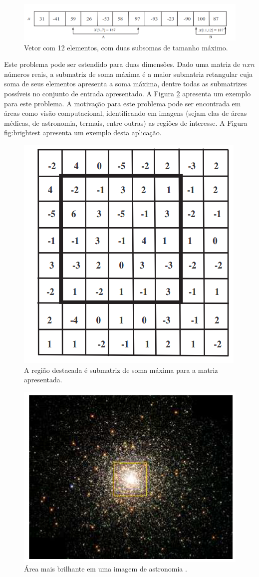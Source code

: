 \documentclass[a4paper, 12pt] {article}
\begin{document}
\begin{figure}[ht]
\centering
\includegraphics[width=\textwidth]{maxsubsum.png}
\caption{Vetor com 12 elementos, com duas subsomas de tamanho máximo.}
\label{fig:maxsubsum}
\end{figure}

Este problema pode ser estendido para duas dimensões. Dado uma matriz de $nxn$
números reais, a submatriz de soma máxima é a maior submatriz retangular cuja
soma de seus elementos apresenta a soma máxima, dentre todas as submatrizes
possíveis no conjunto de entrada apresentado. A Figura \ref{fig:maxsubarray}
apresenta um exemplo para este problema. A motivação para este problema pode ser
encontrada em áreas como visão computacional, identificando em imagens (sejam
elas de áreas médicas, de astronomia, termais, entre outras) as regiões de
interesse. A Figura {fig:brightest} apresenta um exemplo desta aplicação.

\begin{figure}[ht]
\centering
\includegraphics[width=.35\textwidth]{maxsubarray.png}
\caption{A região destacada é submatriz de soma máxima para a matriz
apresentada.}
\label{fig:maxsubarray}
\end{figure}

\begin{figure}[ht]
\centering
\includegraphics[width=.35\textwidth]{brightest.png}
\caption{Área mais brilhante em uma imagem de astronomia \cite{bae2007}.}
\label{fig:brightest}
\end{figure}
\end{document}
